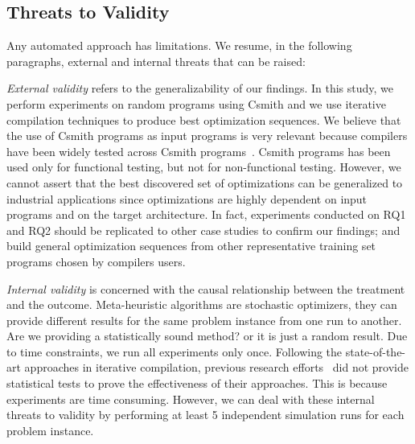 \subsection{Threats to Validity}
Any automated approach has limitations. We resume, in the following paragraphs, external and internal threats that can be raised:
 
\textit{External validity} refers to the generalizability of our findings. In this study, we perform experiments on random programs using Csmith and we use iterative compilation techniques to produce best optimization sequences. We believe that the use of Csmith programs as input programs is very relevant because compilers have been widely tested across Csmith programs~\cite{chen2016empirical,yang2011finding}. Csmith programs has been used only for functional testing, but not for non-functional testing. However, we cannot assert that the best discovered set of optimizations can be generalized to industrial applications since optimizations are highly dependent on input programs and on the target architecture. In fact, experiments conducted on RQ1 and RQ2 should be replicated to other case studies to confirm our findings; and build general optimization sequences from other representative training set programs chosen by compilers users.

\textit{Internal validity} is concerned with the causal relationship between the treatment and the outcome. Meta-heuristic algorithms are stochastic optimizers, they can provide different results for the same problem instance from one run to another. Are we providing a statistically sound method? or it is just a random result. Due to time constraints, we run all experiments only once. Following the state-of-the-art approaches in iterative compilation, previous research efforts~\cite{hoste2008cole,martinez2014multi} did not provide statistical tests to prove the effectiveness of their approaches. This is because experiments are time consuming. However, we can deal with these internal threats to validity by performing at least 5 independent simulation runs for each problem instance.  
 
